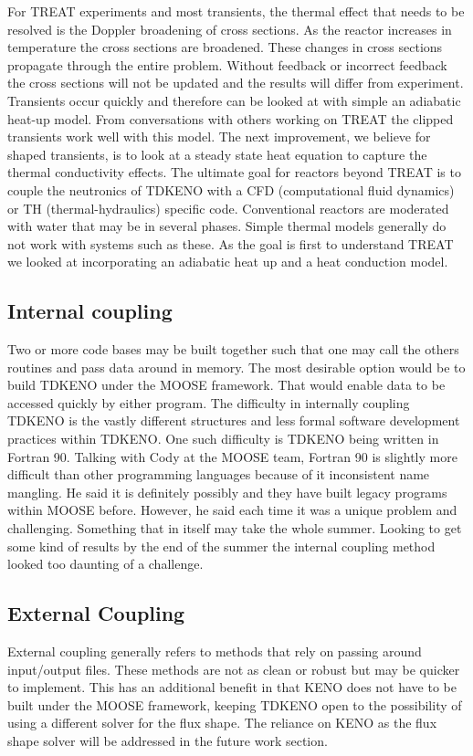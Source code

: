 \documentclass[11pt]{article}
\begin{document}
For TREAT experiments and most transients, the thermal effect that needs to be resolved is the Doppler broadening of cross sections.  As the reactor increases in temperature the cross sections are broadened.  These changes in cross sections propagate through the entire problem.  Without feedback or  incorrect feedback the cross sections will not be updated and the results will differ from experiment.  Transients occur quickly and therefore can be looked at with simple an adiabatic heat-up model.  From conversations with others working on TREAT the clipped transients work well with this model.  The next improvement, we believe for shaped transients, is to look at a steady state heat equation to capture the thermal conductivity effects.  The ultimate goal for reactors beyond TREAT is to couple the neutronics of TDKENO with a CFD (computational fluid dynamics) or TH (thermal-hydraulics) specific code.  Conventional reactors are moderated with water that may be in several phases.  Simple thermal models generally do not work with systems such as these.  As the goal is first to understand TREAT we looked at incorporating an adiabatic heat up  and a heat conduction model.

\subsection{Internal coupling}
 Two or more code bases may be built together such that one may call the others routines and pass data around in memory.  The most desirable option would be to build TDKENO under the MOOSE framework.  That would enable data to be accessed quickly by either program.  The difficulty in internally coupling TDKENO is the vastly different structures and less formal software development practices within TDKENO.  One such difficulty is TDKENO being written in Fortran 90.  Talking with Cody at the MOOSE team, Fortran 90 is slightly more difficult than other programming languages because of it inconsistent name mangling.  He said it is definitely possibly and they have built legacy programs within MOOSE before.  However, he said each time it was a unique problem and challenging.  Something that in itself may take the whole summer.  Looking to get some kind of results by the end of the summer the internal coupling method looked too daunting of a challenge. 

\subsection{External Coupling}
External coupling generally refers to methods that rely on passing around input/output files.  These methods are not as clean or robust but may be quicker to implement. This has an additional benefit in that KENO does not have to be built under the MOOSE framework, keeping TDKENO open to the possibility of using a different solver for the flux shape.  The reliance on KENO as the flux shape solver will be addressed in the future work section. 
\end{document}
